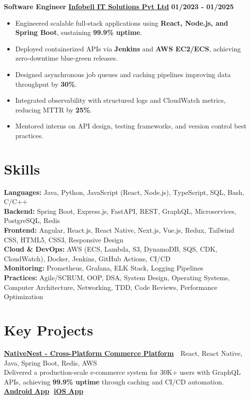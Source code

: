 \documentclass[letterpaper,11pt]{article}
\begin{document}
\textbf{Software Engineer} \hfill \uline{\textbf{Infobell IT Solutions Pvt Ltd}} \hfill \hspace{0.1em} \textbf{01/2023 - 01/2025}
\begin{itemize}[itemsep=2pt, topsep=2pt, parsep=0pt, partopsep=0pt, leftmargin=10pt]
  \item Engineered scalable full-stack applications using \textbf{React, Node.js, and Spring Boot}, sustaining \textbf{99.9\% uptime}.
  \item Deployed containerized APIs via \textbf{Jenkins} and \textbf{AWS EC2/ECS}, achieving zero-downtime blue-green releases.
  \item Designed asynchronous job queues and caching pipelines improving data throughput by \textbf{30\%}.
  \item Integrated observability with structured logs and CloudWatch metrics, reducing MTTR by \textbf{25\%}.
  \item Mentored interns on API design, testing frameworks, and version control best practices.
\end{itemize}

\section{\textbf{Skills}}
\vspace{2pt}
\textbf{Languages:} Java, Python, JavaScript (React, Node.js), TypeScript, SQL, Bash, C/C++ \\
\textbf{Backend:} Spring Boot, Express.js, FastAPI, REST, GraphQL, Microservices, PostgreSQL, Redis \\
\textbf{Frontend:} Angular, React.js, React Native, Next.js, Vue.js, Redux, Tailwind CSS, HTML5, CSS3, Responsive Design \\
\textbf{Cloud \& DevOps:} AWS (ECS, Lambda, S3, DynamoDB, SQS, CDK, CloudWatch), Docker, Jenkins, GitHub Actions, CI/CD \\
\textbf{Monitoring:} Prometheus, Grafana, ELK Stack, Logging Pipelines \\
\textbf{Practices:} Agile/SCRUM, OOP, DSA, System Design, Operating Systems, Computer Architecture, Networking, TDD, Code Reviews, Performance Optimization

\section{\textbf{Key Projects}}
\vspace{2pt}
\href{https://nativenest.in}{\textbf{NativeNest - Cross-Platform Commerce Platform}} \,\textbar\, {React, React Native, Java, Spring Boot, Redis, AWS}\\
Delivered a production-scale e-commerce system for 30K+ users with GraphQL APIs, achieving \textbf{99.9\% uptime} through caching and CI/CD automation.
\href{https://play.google.com/store/apps/details?id=com.nativeroot.nativenest&hl=en_US}{\textbf{Android App}}\,\textbar\,
\href{https://apps.apple.com/in/app/nativenest/id6504481125}{\textbf{iOS App}}
\end{document}
